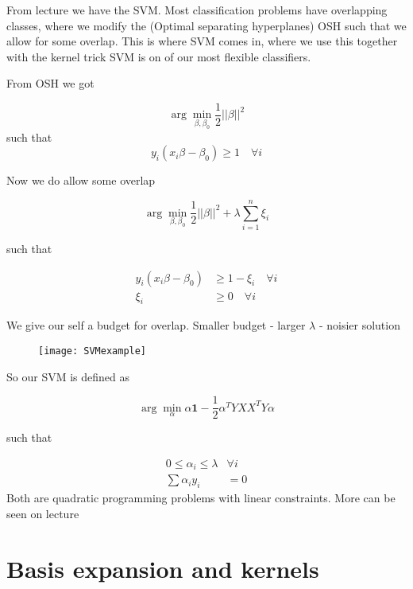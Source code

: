From lecture \cite[p.~31]{lecture5} we have the SVM. Most classification problems have overlapping classes, where we modify the (Optimal separating hyperplanes) OSH such that we allow for some overlap. This is where SVM comes in, where we use this together with the kernel trick SVM is on of our most flexible classifiers.

From OSH we got

\[
    \arg \min\limits_{\beta, \beta_0} \frac{1}{2} ||\beta ||^2
\]
such that
\[
    y_i (x_i \beta - \beta_0) \geq 1 \quad \forall i
\]

Now we do allow some overlap

\[
    \arg \min\limits_{\beta, \beta_0} \frac{1}{2} ||\beta ||^2 + \lambda \sum_{i=1}^{n} \xi_i
\]

such that

\begin{equation}
    \begin{split}
       y_i (x_i \beta - \beta_0) & \geq 1 - \xi_i \quad \forall i \\
        \xi_i & \geq 0 \quad \forall i
    \end{split}
\end{equation}

We give our self a budget for overlap. Smaller budget - larger $\lambda$ - noisier solution

\begin{figure}[H]
  \centering
  \texttt{[image: SVMexample]}
\end{figure}

So our SVM is defined as

\[
    \arg \min\limits_{\alpha} \alpha \bm{1} - \frac{1}{2} \alpha^T Y XX^T Y \alpha
\]

such that

\begin{equation}
    \begin{split}
       0 \leq \alpha_i \leq \lambda & \forall i \\
       \sum \alpha_i y_i & = 0
    \end{split}
\end{equation}
Both are quadratic programming problems with linear constraints. More can be seen on lecture \cite[p.~34-35]{lecture5}



\section{Basis expansion and kernels}


